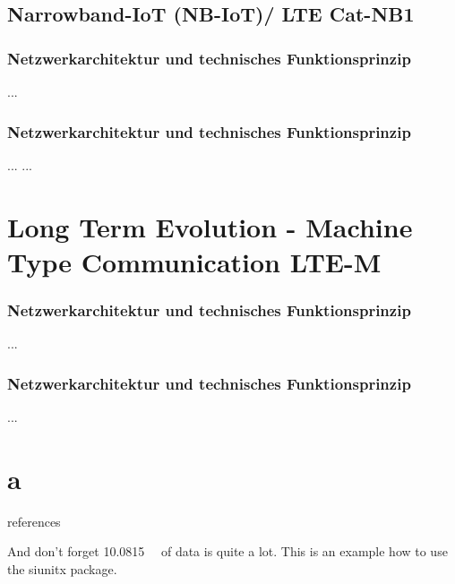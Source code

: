 \subsection{Narrowband-IoT (NB-IoT)/ LTE Cat-NB1}
\subsubsection{Netzwerkarchitektur und technisches Funktionsprinzip}
...

\subsubsection{Netzwerkarchitektur und technisches Funktionsprinzip}
...
...


\section{Long Term Evolution - Machine Type Communication LTE-M}
\subsubsection{Netzwerkarchitektur und technisches Funktionsprinzip}
...

\subsubsection{Netzwerkarchitektur und technisches Funktionsprinzip}
...


\section{a}
references


And don't forget \SI{10.0815}{\giga\byte} of data is quite a lot.
This is an example how to use the siunitx package.

